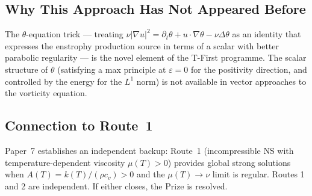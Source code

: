 \documentclass[11pt]{article}
\theoremstyle{definition}
\theoremstyle{remark}
\newcommand{\prt}{\partial_t}
\newcommand{\grad}{\nabla}
\newcommand{\eps}{\varepsilon}
\begin{document}
\subsection{Why This Approach Has Not Appeared Before}

The $\theta$-equation trick — treating $\nu|\grad u|^2 = \prt\theta + u\cdot\grad\theta
- \nu\Delta\theta$ as an identity that expresses the enstrophy production source
in terms of a scalar with better parabolic regularity — is the novel element of
the T-First programme.  The scalar structure of $\theta$ (satisfying a max
principle at $\eps=0$ for the positivity direction, and controlled by the
energy for the $L^1$ norm) is not available in vector approaches to the
vorticity equation.

\subsection{Connection to Route~1}

Paper~7 establishes an independent backup: Route~1 (incompressible NS with
temperature-dependent viscosity $\mu(T)>0$) provides global strong solutions
when $A(T)=k(T)/(\rho c_v)>0$ and the $\mu(T)\to\nu$ limit is regular.
Routes 1 and 2 are independent.  If either closes, the Prize is resolved.
\end{document}
